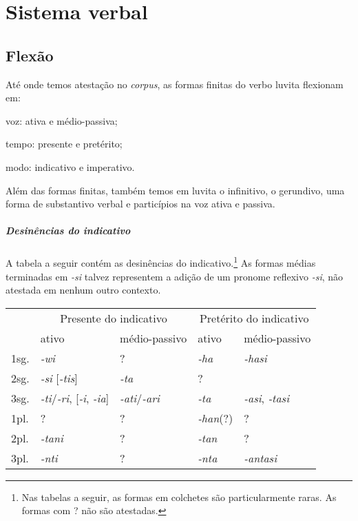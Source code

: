 
\chapter{Sistema verbal}

\section{Flexão}

Até onde temos atestação no \emph{corpus}, as formas finitas do verbo luvita 
flexionam em:
\begin{inparaenum}[(a)]
	\item voz: ativa e médio-passiva;
	\item tempo: presente e pretérito;
	\item modo: indicativo e imperativo.
\end{inparaenum}
Além das formas finitas, também temos em luvita o infinitivo, o gerundivo, uma 
forma de substantivo verbal e particípios na voz ativa e passiva.

\paragraph{Desinências do indicativo}
A tabela a seguir contém as desinências do indicativo.\footnote{Nas tabelas a
seguir, as formas em colchetes são particularmente raras. As formas com {?} não
são atestadas.}
As formas médias terminadas em \emph{-si} talvez representem a adição de um
pronome reflexivo \emph{-si}, não atestada em nenhum outro contexto.

\begin{center}
	\begin{tabular}[c]{lll|ll}
		\toprule
		&\multicolumn{2}{c|}{Presente do indicativo}&\multicolumn{2}{c}{Pretérito do indicativo}\\
		& ativo & médio-passivo & ativo & médio-passivo\\
		\midrule
		1sg. & \emph{-wi}                                            & {?}                            & \emph{-ha}       & \emph{-hasi}              \\
		2sg. & \emph{-si} [\emph{-tis}]                              & \emph{-ta}                     & {?}              &                           \\
		3sg. & \emph{-ti}\slash{}\emph{-ri}, [\emph{-i}, \emph{-ia}] & \emph{-ati}\slash{}\emph{-ari} & \emph{-ta}       & \emph{-asi}, \emph{-tasi} \\
		1pl. & {?}                                                   & {?}                            & \emph{-han}{(?)} & {?}                       \\
		2pl. & \emph{-tani}                                          & {?}                            & \emph{-tan}      & {?}                       \\
		3pl. & \emph{-nti}                                           & {?}                            & \emph{-nta}      & \emph{-antasi}            \\
		\bottomrule
	\end{tabular}
\end{center}

